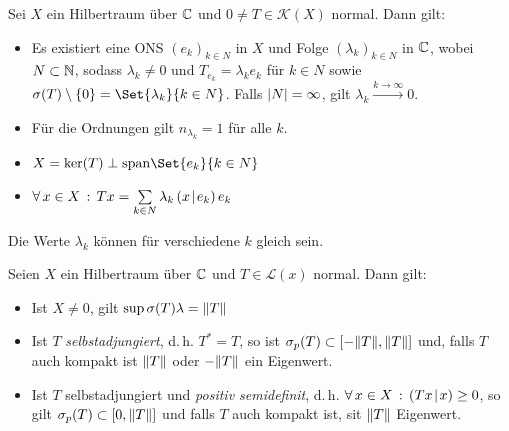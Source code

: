 \documentclass{cheat-sheet}
\newcommand{\LSO}{\mathcal{L}} %
\newcommand{\scp}[2]{\left( #1 \!\mid\! #2 \right)} %
\newcommand{\convWith}[1]{\xrightarrow{#1 \to \infty}} %
\begin{document}
\begin{satz}
  Sei $X$ ein Hilbertraum über $\mathbb{C}$ und $0 \not= T \in \mathcal{K}(X)$ normal. Dann gilt:
  \begin{itemize}
    \item Es existiert eine ONS $(e_k)_{k \in N}$ in $X$ und Folge $(\lambda_k)_{k \in N}$ in $\mathbb{C}$, wobei $N \subset \mathbb{N}$, sodass $\lambda_k \not= 0$ und $T_{e_k} = \lambda_k e_k$ für $k \in N$ sowie $\sigma(T) \setminus \{ 0 \} = \Set{ \lambda_k }{ k \in N }$. Falls $\lvert N\rvert = \infty$, gilt $\lambda_k \convWith{k} 0$.
    \item Für die Ordnungen gilt $n_{\lambda_k} = 1$ für alle $k$.
    \item $X = \ker(T) \perp \mathrm{span} \Set{ e_k }{ k \in N }$
    \item $\fa{x \in X} Tx = \sum_{k \in N} \lambda_k \scp{x}{e_k} e_k$
  \end{itemize}
\end{satz}

\begin{bem}
  Die Werte $\lambda_k$ können für verschiedene $k$ gleich sein.
\end{bem}

\begin{lem}
  Seien $X$ ein Hilbertraum über $\mathbb{C}$ und $T \in \LSO(x)$ normal. Dann gilt:
  \begin{itemize}
    \item  Ist $X \not= 0$, gilt $\sup \sigma(T) \lambda = \lVert T\rVert$
    \item Ist $T$ \emph{selbstadjungiert}, d.\,h. $T^* = T$, so ist $\sigma_p(T) \subset \left[ -\lVert T\rVert, \lVert T\rVert \right]$ und, falls $T$ auch kompakt ist $\lVert T\rVert$ oder $-\lVert T\rVert$ ein Eigenwert.
    \item Ist $T$ selbstadjungiert und \emph{positiv semidefinit}, d.\,h. $\fa{x \in X} \scp{Tx}{x} \geq 0$, so gilt $\sigma_p(T) \subset \left[ 0, \lVert T\rVert \right]$ und falls $T$ auch kompakt ist, sit $\lVert T\rVert$ Eigenwert.
  \end{itemize}
\end{lem}
\end{document}
